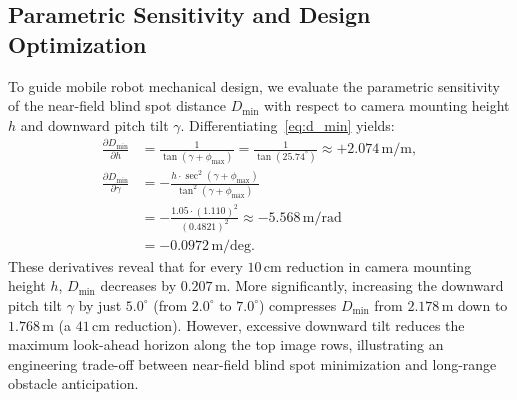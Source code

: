 \documentclass{ieeeaccess}
\begin{document}
\subsection{Parametric Sensitivity and Design Optimization}
\label{subsec:sensitivity}
To guide mobile robot mechanical design, we evaluate the parametric sensitivity of the near-field blind spot distance $D_{\min}$ with respect to camera mounting height $h$ and downward pitch tilt $\gamma$. Differentiating~\eqref{eq:d_min} yields:
\begin{align}
  \frac{\partial D_{\min}}{\partial h} &= \frac{1}{\tan(\gamma + \phi_{\max})} = \frac{1}{\tan(25.74^\circ)} \approx +2.074\,\text{m/m}, \\
  \frac{\partial D_{\min}}{\partial \gamma} &= -\frac{h \cdot \sec^2(\gamma + \phi_{\max})}{\tan^2(\gamma + \phi_{\max})} \nonumber \\
  &= -\frac{1.05 \cdot (1.110)^2}{(0.4821)^2} \approx -5.568\,\text{m/rad} \nonumber \\
  &= -0.0972\,\text{m/deg}.
\end{align}
These derivatives reveal that for every $10$\,cm reduction in camera mounting height $h$, $D_{\min}$ decreases by $0.207$\,m. More significantly, increasing the downward pitch tilt $\gamma$ by just $5.0^\circ$ (from $2.0^\circ$ to $7.0^\circ$) compresses $D_{\min}$ from $2.178$\,m down to $1.768$\,m (a $41$\,cm reduction). However, excessive downward tilt reduces the maximum look-ahead horizon along the top image rows, illustrating an engineering trade-off between near-field blind spot minimization and long-range obstacle anticipation.
\end{document}
